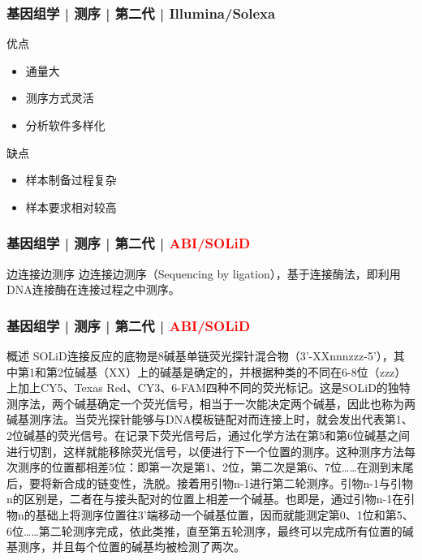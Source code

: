 \begin{frame}
  \frametitle{基因组学 | 测序 | 第二代 | Illumina/Solexa}
  \begin{block}{优点}
    \begin{itemize}
      \item 通量大
      \item 测序方式灵活
      \item 分析软件多样化
    \end{itemize}
  \end{block}
  \pause
  \begin{block}{缺点}
    \begin{itemize}
      \item 样本制备过程复杂
      \item 样本要求相对较高
    \end{itemize}
  \end{block}
\end{frame}

\begin{frame}
  \frametitle{基因组学 | 测序 | 第二代 | \textcolor{red}{ABI/SOLiD}}
  \begin{block}{边连接边测序}
边连接边测序（Sequencing by ligation），基于连接酶法，即利用DNA连接酶在连接过程之中测序。  
  \end{block}
\end{frame}

\begin{frame}
  \frametitle{基因组学 | 测序 | 第二代 | \textcolor{red}{ABI/SOLiD}}
  \begin{block}{概述}
SOLiD连接反应的底物是8碱基单链荧光探针混合物（3'-XXnnnzzz-5'），其中第1和第2位碱基（XX）上的碱基是确定的，并根据种类的不同在6-8位（zzz）上加上CY5、Texas Red、CY3、6-FAM四种不同的荧光标记。这是SOLiD的独特测序法，两个碱基确定一个荧光信号，相当于一次能决定两个碱基，因此也称为两碱基测序法。当荧光探针能够与DNA模板链配对而连接上时，就会发出代表第1、2位碱基的荧光信号。在记录下荧光信号后，通过化学方法在第5和第6位碱基之间进行切割，这样就能移除荧光信号，以便进行下一个位置的测序。这种测序方法每次测序的位置都相差5位：即第一次是第1、2位，第二次是第6、7位……在测到末尾后，要将新合成的链变性，洗脱。接着用引物n-1进行第二轮测序。引物n-1与引物n的区别是，二者在与接头配对的位置上相差一个碱基。也即是，通过引物n-1在引物n的基础上将测序位置往3'端移动一个碱基位置，因而就能测定第0、1位和第5、6位……第二轮测序完成，依此类推，直至第五轮测序，最终可以完成所有位置的碱基测序，并且每个位置的碱基均被检测了两次。
  \end{block}
\end{frame}

